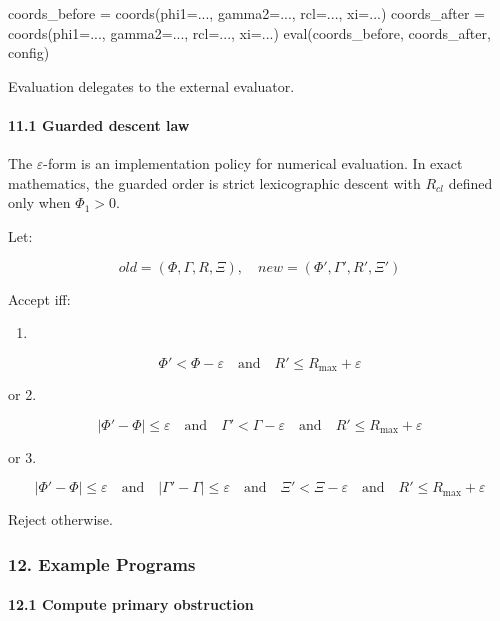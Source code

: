 \documentclass[
]{article}
\newenvironment{Shaded}{\begin{snugshade}}{\end{snugshade}}
\newcommand{\NormalTok}[1]{\textcolor[rgb]{0.12,0.11,0.11}{#1}}
\providecommand{\tightlist}{%
  \setlength{\itemsep}{0pt}\setlength{\parskip}{0pt}}
\providecommand{\tightlist}{%
  \setlength{\itemsep}{0pt}\setlength{\parskip}{0pt}}
\begin{document}
\begin{Shaded}
\begin{Highlighting}[]
\NormalTok{coords\_before = coords(phi1=..., gamma2=..., rcl=..., xi=...)}
\NormalTok{coords\_after  = coords(phi1=..., gamma2=..., rcl=..., xi=...)}
\NormalTok{eval(coords\_before, coords\_after, config)}
\end{Highlighting}
\end{Shaded}

Evaluation delegates to the external evaluator.

\paragraph{11.1 Guarded descent law}\label{guarded-descent-law}

The \(\varepsilon\)-form is an implementation policy for numerical evaluation. In exact mathematics, the guarded order is strict lexicographic descent with \(R_{cl}\) defined only when \(\Phi_1>0\).

Let:

\[
old=(\Phi,\Gamma,R,\Xi),\quad new=(\Phi',\Gamma',R',\Xi')
\]

Accept iff:

\begin{enumerate}
\def\labelenumi{\arabic{enumi}.}
\tightlist
\item
\end{enumerate}

\[
\Phi' < \Phi - \varepsilon
\quad\text{and}\quad
R' \le R_{\max}+\varepsilon
\]

or 2.

\[
|\Phi'-\Phi|\le \varepsilon
\quad\text{and}\quad
\Gamma' < \Gamma-\varepsilon
\quad\text{and}\quad
R' \le R_{\max}+\varepsilon
\]

or 3.

\[
|\Phi'-\Phi|\le \varepsilon
\quad\text{and}\quad
|\Gamma'-\Gamma|\le \varepsilon
\quad\text{and}\quad
\Xi' < \Xi-\varepsilon
\quad\text{and}\quad
R' \le R_{\max}+\varepsilon
\]

Reject otherwise.

\subsubsection{12. Example Programs}\label{example-programs}

\paragraph{12.1 Compute primary obstruction}\label{compute-primary-obstruction}
\end{document}
